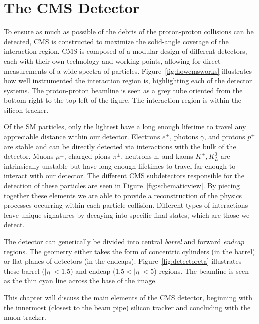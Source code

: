 \chapter{The CMS Detector}
\label{chap:detector}

To ensure as much as possible of the debris of the proton-proton collisions can be detected, CMS is constructed to maximize the solid-angle coverage of the interaction region. CMS is composed of a modular design of different detectors, each with their own technology and working points, allowing for direct measurements of a wide spectra of particles. Figure~\ref{fig:howcmsworks} illustrates how well instrumented the interaction region is, highlighting each of the detector systems. The proton-proton beamline is seen as a grey tube oriented from the bottom right to the top left of the figure. The interaction region is within the silicon tracker.

Of the SM particles, only the lightest have a long enough lifetime to travel any appreciable distance within our detector. Electrons $e^{\pm}$, photons $\gamma$, and protons $p^{\pm}$ are stable and can be directly detected via interactions with the bulk of the detector. Muons $\mu^{\pm}$, charged pions $\pi^{\pm}$, neutrons n, and kaons $K^{\pm}, K^{0}_{L}$ are intrinsically unstable but have long enough lifetimes to travel far enough to interact with our detector. The different CMS subdetectors responsible for the detection of these particles are seen in Figure~\ref{fig:schematicview}. By piecing together these elements we are able to provide a reconstruction of the physics processes occurring within each particle collision. Different types of interactions leave unique signatures by decaying into specific final states, which are those we detect.

The detector can generically be divided into central \textit{barrel} and forward \textit{endcap} regions. The geometry either takes the form of concentric cylinders (in the barrel) or flat planes of detectors (in the endcaps). Figure~\ref{fig:detectoreta} illustrates these barrel ($|\eta|<1.5$) and endcap ($1.5<|\eta|<5$) regions. The beamline is seen as the thin cyan line across the base of the image.  

This chapter will discuss the main elements of the CMS detector, beginning with the innermost (closest to the beam pipe) silicon tracker and concluding with the muon tracker. 

